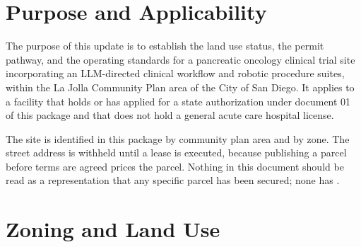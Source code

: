 
\section{Purpose and Applicability}

The purpose of this update is to establish the land use status, the permit
pathway, and the operating standards for a pancreatic oncology clinical trial
site incorporating an LLM-directed clinical workflow and robotic procedure
suites, within the La Jolla Community Plan area of the City of San Diego. It
applies to a facility that holds or has applied for a state authorization under
document 01 of this package and that does not hold a general acute care hospital
license.

The site is identified in this package by community plan area and by zone. The
street address is withheld until a lease is executed, because publishing a
parcel before terms are agreed prices the parcel. Nothing in this document
should be read as a representation that any specific parcel has been secured;
none has \cite{sdmc}.

\section{Zoning and Land Use}

